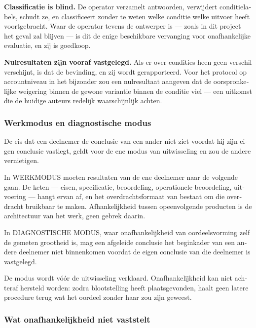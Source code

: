 \begin{dutch}
\textbf{Classificatie is blind.} De operator verzamelt antwoorden, verwijdert conditielabels, schudt ze, en classificeert zonder te weten welke conditie welke uitvoer heeft voortgebracht. Waar de operator tevens de ontwerper is — zoals in dit project het geval zal blijven — is dit de enige beschikbare vervanging voor onafhankelijke evaluatie, en zij is goedkoop.

\textbf{Nulresultaten zijn vooraf vastgelegd.} Als er over condities heen geen verschil verschijnt, is dat de bevinding, en zij wordt gerapporteerd. Voor het protocol op accountniveau in het bijzonder zou een nulresultaat aangeven dat de oorspronkelijke weigering binnen de gewone variantie binnen de conditie viel — een uitkomst die de huidige auteurs redelijk waarschijnlijk achten.


\subsubsection*{Werkmodus en diagnostische modus}
\label{sec:nl:x-werkmodus-en-diagnostische-modus}

De eis dat een deelnemer de conclusie van een ander niet ziet voordat hij zijn eigen conclusie vastlegt, geldt voor de ene modus van uitwisseling en zou de andere vernietigen.

In WERKMODUS moeten resultaten van de ene deelnemer naar de volgende gaan. De keten — eisen, specificatie, beoordeling, operationele beoordeling, uitvoering — hangt ervan af, en het overdrachtsformaat van  bestaat om die overdracht bruikbaar te maken. Afhankelijkheid tussen opeenvolgende producten is de architectuur van het werk, geen gebrek daarin.

In DIAGNOSTISCHE MODUS, waar onafhankelijkheid van oordeelsvorming zelf de gemeten grootheid is, mag een afgeleide conclusie het beginkader van een andere deelnemer niet binnenkomen voordat de eigen conclusie van die deelnemer is vastgelegd.

De modus wordt vóór de uitwisseling verklaard. Onafhankelijkheid kan niet achteraf hersteld worden: zodra blootstelling heeft plaatsgevonden, haalt geen latere procedure terug wat het oordeel zonder haar zou zijn geweest.


\subsubsection*{Wat onafhankelijkheid niet vaststelt}
\label{sec:nl:x-wat-onafhankelijkheid-niet-vaststelt}


\end{dutch}
